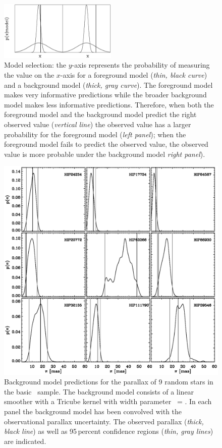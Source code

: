 \clearpage
\begin{figure}
\includegraphics[width=0.5\textwidth]{figs_groups/model_selection.eps}
\caption[Model selection]{Model selection: the $y$-axis represents the
  probability of measuring the value on the $x$-axis for a foreground
  model (\emph{thin, black curve}) and a background model
  (\emph{thick, gray curve}). The foreground model makes very
  informative predictions while the broader background model makes
  less informative predictions. Therefore, when both the foreground
  model and the background model predict the right observed value
  (\emph{vertical line}) the observed value has a larger probability
  for the foreground model (\emph{left panel}); when the foreground
  model fails to predict the observed value, the observed value is
  more probable under the background model \emph{right
  panel}).}\label{fig:model_selection}
\end{figure}

\clearpage
\begin{figure}
\includegraphics[width=\textwidth]{figs_groups/predict_plx_background_random.ps}
\caption[Background model predictions for the parallax of 9 random
  stars in the basic \Hipparcos\ sample]{Background model predictions
  for the parallax of 9 random stars in the basic \Hipparcos\
  sample. The background model consists of a linear smoother with a
  Tricube kernel with width parameter \kernelwidth\ =
  \fiducialkernelwidth. In each panel the background model has been
  convolved with the observational parallax uncertainty. The observed
  parallax (\emph{thick, black line}) as well as 95\,percent
  confidence regions (\emph{thin, gray lines}) are
  indicated.}\label{fig:back_random}
\end{figure}


